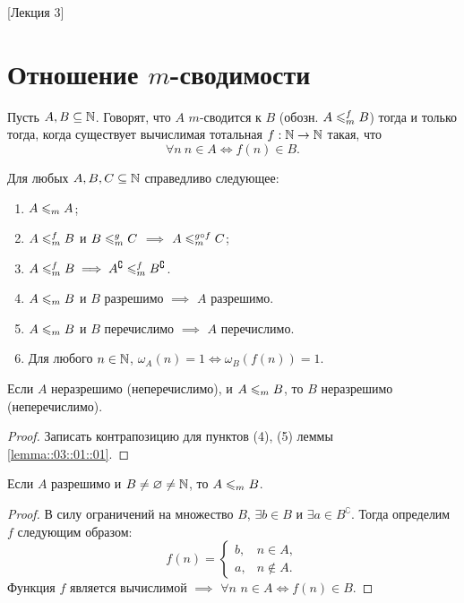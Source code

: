 [Лекция 3]
\newpage

\section{Отношение $m$-сводимости}

\begin{definition}
    Пусть $A, B \subseteq \mathbb{N}$.
    Говорят, что $A$ $m$-сводится к $B$ (обозн. $A \leqslant_{m}^{f} B$) тогда и только тогда, когда существует вычислимая тотальная $f: \mathbb{N} \to \mathbb{N}$ такая, что
    $$
        \forall n~ n \in A \iff f(n) \in B.
    $$
\end{definition}

\begin{lemma} \label{lemma::03::01::01}
    Для любых $A, B, C \subseteq \mathbb{N}$ справедливо следующее:
    \begin{enumerate}
        \item $A \leqslant_{m} A$;
        \item $A \leqslant_{m}^{f} B$ и $B \leqslant_{m}^{g} C$ $\implies$ $A \leqslant_{m}^{g \circ f} C$;
        \item $A \leqslant_{m}^{f} B \implies A^{\complement} \leqslant_{m}^{f} B^{\complement}$.
        \item $A \leqslant_{m} B$ и $B$ разрешимо $\implies$ $A$ разрешимо.
        \item $A \leqslant_{m} B$ и $B$ перечислимо $\implies$ $A$ перечислимо.
        \item Для любого $n \in \mathbb{N}$, $\omega_{A}\left(n\right) = 1 \iff \omega_{B}\left(f\left(n\right)\right) = 1$.
    \end{enumerate}
\end{lemma}

\begin{corollary}
    Если $A$ неразрешимо (неперечислимо), и $A \leqslant_{m} B$, то $B$ неразрешимо (неперечислимо).
\end{corollary}
\begin{proof}
    Записать контрапозицию для пунктов (4), (5) леммы \ref{lemma::03::01::01}.
\end{proof}

\begin{statement}
    Если $A$ разрешимо и $B \neq \varnothing \neq \mathbb{N}$, то $A \leqslant_{m} B$.
\end{statement}
\begin{proof}
    В силу ограничений на множество $B$, $\exists b \in B$ и $\exists a \in B^{\complement}$.
    Тогда определим $f$ следующим образом:
    $$
        f\left(n\right) = \begin{cases}
            b, & n \in A, \\
            a, & n \notin A.
        \end{cases}
    $$
    Функция $f$ является вычислимой $\implies$ $\forall n$ $n \in A \iff f(n) \in B$.
\end{proof}

